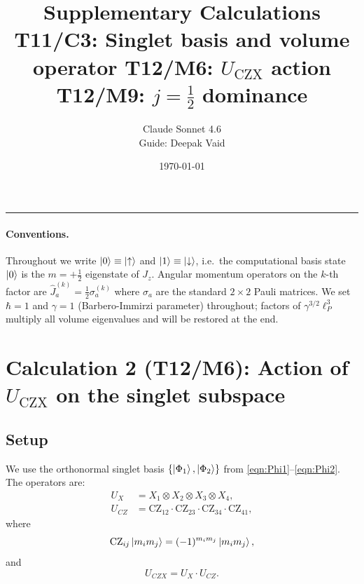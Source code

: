 \documentclass[11pt,a4paper]{article}
\title{Supplementary Calculations\\[0.5ex]
  \large T11/C3: Singlet basis and volume operator\quad
  T12/M6: $U_{\mathrm{CZX}}$ action\quad
  T12/M9: $j=\tfrac{1}{2}$ dominance}
\author{Claude Sonnet 4.6 \\ \small Guide: Deepak Vaid}
\date{\today}
\newcommand{\uarr}{\uparrow}
\newcommand{\darr}{\downarrow}
\newcommand{\lp}{\ell_P}
\newcommand{\CZ}{\mathrm{CZ}}
\theoremstyle{definition}
\begin{document}
\maketitle
\tableofcontents
\bigskip
\hrule
\bigskip

\paragraph{Conventions.}
Throughout we write $\ket{0} \equiv \ket{\uarr}$ and $\ket{1} \equiv \ket{\darr}$,
i.e.\ the computational basis state $\ket{0}$ is the $m=+\tfrac{1}{2}$ eigenstate of
$J_z$.  Angular momentum operators on the $k$-th factor are
$\hat{J}^{(k)}_a = \tfrac{1}{2}\sigma_a^{(k)}$ where $\sigma_a$ are the standard
$2\times 2$ Pauli matrices.  We set $\hbar = 1$ and $\gamma = 1$ (Barbero-Immirzi
parameter) throughout; factors of $\gamma^{3/2}\lp^3$ multiply all volume eigenvalues
and will be restored at the end.






\section{Calculation 2 (T12/M6): Action of $U_{\mathrm{CZX}}$ on the singlet
  subspace}
\label{sec:calc2}

\subsection{Setup}

We use the orthonormal singlet basis $\{\ket{\Phi_1},\ket{\Phi_2}\}$ from
\eqref{eqn:Phi1}--\eqref{eqn:Phi2}.  The operators are:
\begin{align}
  U_X &= X_1\otimes X_2\otimes X_3\otimes X_4,\label{eqn:UX}\\
  U_{CZ} &= \CZ_{12}\cdot\CZ_{23}\cdot\CZ_{34}\cdot\CZ_{41},\label{eqn:UCZ}
\end{align}
where
\begin{equation}
  \CZ_{ij}\ket{m_i m_j} = (-1)^{m_i m_j}\ket{m_i m_j},
\end{equation}
and
\begin{equation}
  U_{CZX} = U_X\cdot U_{CZ}.\label{eqn:UCZX}
\end{equation}
\end{document}
